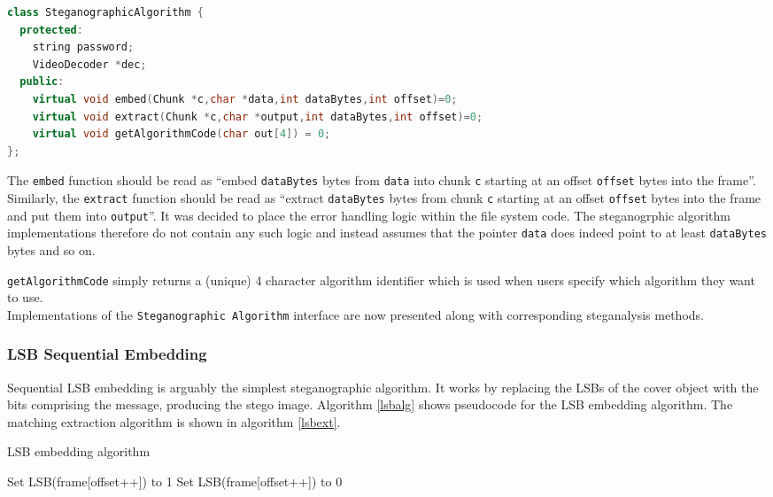 \documentclass[paper=a4, fontsize=11pt,twoside]{scrartcl}
\numberwithin{table}{section}
\numberwithin{figure}{section}
\numberwithin{algorithm}{section}
\begin{document}
\begin{lstlisting}[language=C++, caption={\texttt{Stego Algorithm} interface (\texttt{steg/steganographic\_algorithm.h:8})}, frame=single, label=stegoalg]
class SteganographicAlgorithm {
  protected:
    string password;
    VideoDecoder *dec;
  public:
    virtual void embed(Chunk *c,char *data,int dataBytes,int offset)=0;
    virtual void extract(Chunk *c,char *output,int dataBytes,int offset)=0;
    virtual void getAlgorithmCode(char out[4]) = 0;
};
\end{lstlisting}

\noindent
The \texttt{embed} function should be read as ``embed \texttt{dataBytes} bytes from \texttt{data} into chunk \texttt{c} starting at an offset \texttt{offset} bytes into the frame''. Similarly, the \texttt{extract} function should be read as ``extract \texttt{dataBytes} bytes from chunk \texttt{c} starting at an offset \texttt{offset} bytes into the frame and put them into \texttt{output}''. It was decided to place the error handling logic within the file system code. The steganogrphic algorithm implementations therefore do not contain any such logic and instead assumes that the pointer \texttt{data} does indeed point to at least \texttt{dataBytes} bytes and so on.

\texttt{getAlgorithmCode} simply returns a (unique) 4 character algorithm identifier which is used when users specify which algorithm they want to use.\\

\noindent
Implementations of the \texttt{Steganographic Algorithm} interface are now presented along with corresponding steganalysis methods. 

\subsubsection{LSB Sequential Embedding}

Sequential LSB embedding is arguably the simplest steganographic algorithm. It works by replacing the LSBs of the cover object with the bits comprising the message, producing the stego image. Algorithm \ref{lsbalg} shows pseudocode for the LSB embedding algorithm. The matching extraction algorithm is shown in algorithm \ref{lsbext}.


\begin{algorithm}[!h]
\caption{LSB embedding algorithm}
\label{lsbalg}
\begin{algorithmic}[1]
			\State Set LSB(frame[offset++]) to 1
		\Else
			\State Set LSB(frame[offset++]) to 0
		\EndIf
	\EndFor
\EndFor
\end{algorithmic}
\end{algorithm}
\end{document}
